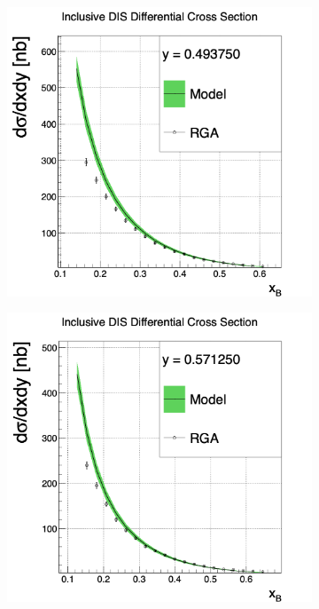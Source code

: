 \begin{figure}[h!]
	\centering
	\begin{subfigure}[b]{0.38\linewidth}
		\includegraphics[width=\linewidth]{figures/rga/xsec_2.png}
		\label{fig:rga_xsec2}
	\end{subfigure}
	\begin{subfigure}[b]{0.38\textwidth}
		\includegraphics[width=\linewidth]{figures/rga/xsec_3.png}
		\label{fig:rga_xsec3}
	\end{subfigure}
\end{figure}
